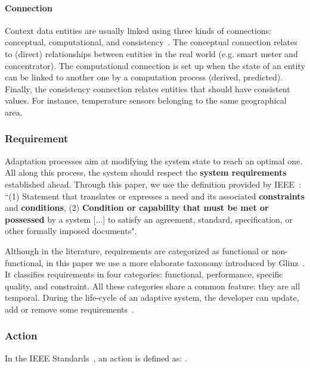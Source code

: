 \paragraph{Connection}
Context data entities are usually linked using three kinds of connections: conceptual, computational, and consistency~\cite{DBLP:conf/pervasive/HenricksenIR02, DBLP:journals/percom/BettiniBHINRR10}.
The conceptual connection relates to  (direct) relationships between entities in the real world (e.g. smart meter and concentrator).
The computational connection is set up when the state of an entity can be linked to another one by a computation process (derived, predicted). 
Finally, the consistency connection relates entities that should have consistent values. For instance, temperature sensors belonging to the same geographical area.

\subsubsection{Requirement}
\label{sec:adaptation-req}

Adaptation processes aim at modifying the system state to reach an optimal one.
All along this process, the system should respect the \textbf{system requirements} established ahead. 
Through this paper, we use the definition provided by IEEE~\cite{iso2017systems}: ``(1) Statement that translates or expresses a need and its associated \textbf{constraints} and \textbf{conditions}, (2) \textbf{Condition or capability that must be met or possessed} by a system [...] to satisfy an agreement, standard, specification, or other formally imposed documents".

Although in the literature, requirements are categorized as functional or non-func\-tional, in this paper we use a more elaborate taxonomy introduced by Glinz~\cite{DBLP:conf/re/Glinz07}.
It classifies requirements in four categories: functional, performance, specific quality, and constraint.
All these categories share a common feature: they are all temporal.
During the life-cycle of an adaptive system, the developer can update, add or remove some requirements~\cite{DBLP:conf/icse/ChengA07, pandey2010effective}.

\subsubsection{Action}
In the IEEE Standards~\cite{iso2017systems}, an action is defined as: .

